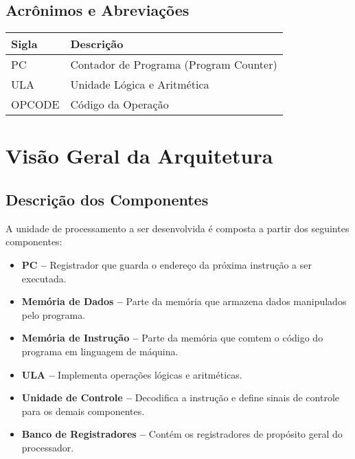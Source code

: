 \documentclass{report}
\begin{document}
  \section{Acrônimos e Abreviações}
    \FloatBarrier
    \begin{table}[H]
      \begin{center}
        \begin{tabular}[pos]{|m{2cm} | m{12cm}|} 
          \hline
          \cellcolor[gray]{0.9}\textbf{Sigla} & \cellcolor[gray]{0.9}\textbf{Descrição} \\ \hline
             PC       &  Contador de Programa (Program Counter)\\ \hline
             ULA      &  Unidade Lógica e Aritmética\\ \hline
             OPCODE   &  Código da Operação\\ \hline
        \end{tabular}
      \end{center}
    \end{table}  

\chapter{Visão Geral da Arquitetura}

  \section{Descrição dos Componentes}
  A unidade de processamento a ser desenvolvida é composta a partir dos seguintes componentes:
  
  \begin{itemize}
    \item \textbf{PC --} Registrador que guarda o endereço da próxima instrução a ser executada.
    \item \textbf{Memória de Dados --} Parte da memória que armazena dados manipulados pelo programa.
    \item \textbf{Memória de Instrução --} Parte da memória que comtem o código do programa em linguagem de máquina.
    \item \textbf{ULA --} Implementa operações lógicas e aritméticas.
    \item \textbf{Unidade de Controle --} Decodifica a instrução e define sinais de controle para os demais componentes.
    \item \textbf{Banco de Registradores --} Contém os registradores de propósito geral do processador.
  \end{itemize}
  
\end{document}
